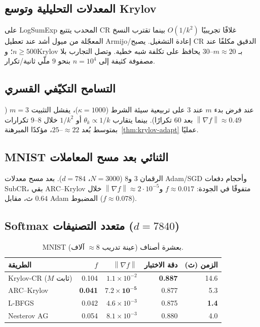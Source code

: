 \documentclass[11pt,a4paper]{article}
\theoremstyle{plain}
\theoremstyle{definition}
\newcommand{\norm}[1]{\left\|#1\right\|}
\newcommand{\grad}{\nabla}
\begin{document}
\subsection{المعدلات التحليلية وتوسع Krylov}
على LogSumExp المحدب يتتبع CR غلافًا تجريبيًا $O(1/k^{2})$ بينما تقترب النسخ المعجّلة من ميول أشد عند تعطيل Armijo/إعادة التشغيل.
يصبح CR الدقيق مكلفًا عند $n\ge 500$؛ وKrylov بـ $m\approx 20$--$30$ يحافظ على تكلفة شبه خطية.
وتصل التجارب بلا مصفوفة كثيفة إلى $n=10^{4}$ بنحو $9$ ملّي ثانية/تكرار.

\subsection{التسامح التكيّفي القسري}
عند فرض بدء $m$ عند $3$ على تربيعية سيئة الشرط ($\kappa=1000$)، يفشل التثبيت $m{=}3$ ($\norm{\grad f}\approx 0.49$ بعد $60$ تكرارًا).
بينما يتقارب $\theta_{k}\propto 1/k$ أو $1/k^{2}$ خلال $8$--$9$ تكرارات بمتوسط بُعد $\approx 22$--$25$، مؤكدًا المبرهنة~\ref{thm:krylov-adapt} عمليًا.

\subsection{MNIST الثنائي بعد مسح المعاملات}
الرقمان $3$ و$8$ ($N{=}3000$، $d{=}784$).
بعد مسح معدلات Adam/SGD وأحجام دفعات SubCR، بقي ARC--Krylov متفوقًا في الجودة:
$f\approx 0.017$ و$\norm{\grad f}\approx 2\cdot 10^{-5}$ خلال $0.64$ ث، مقابل Adam المضبوط ($f\approx 0.078$).

\subsection{Softmax متعدد التصنيفات ($d=7840$)}
\begin{table}[t]
\centering
\caption{MNIST بعشرة أصناف (عينة تدريب $\approx 8$ آلاف).}
\label{tab:softmax}
\begin{tabular}{lrrrr}
\toprule
الطريقة & $f$ & $\norm{\grad f}$ & دقة الاختبار & الزمن (ث) \\
\midrule
Krylov-CR ($M$ ثابت) & 0.104 & $1.1{\times}10^{-2}$ & \textbf{0.887} & 14.6 \\
ARC--Krylov & \textbf{0.041} & $\mathbf{7.2{\times}10^{-5}}$ & 0.877 & 5.3 \\
L-BFGS & 0.042 & $4.6{\times}10^{-3}$ & 0.875 & \textbf{1.4} \\
Nesterov AG & 0.054 & $8.1{\times}10^{-3}$ & 0.880 & 4.0 \\
\bottomrule
\end{tabular}
\end{table}
\end{document}
